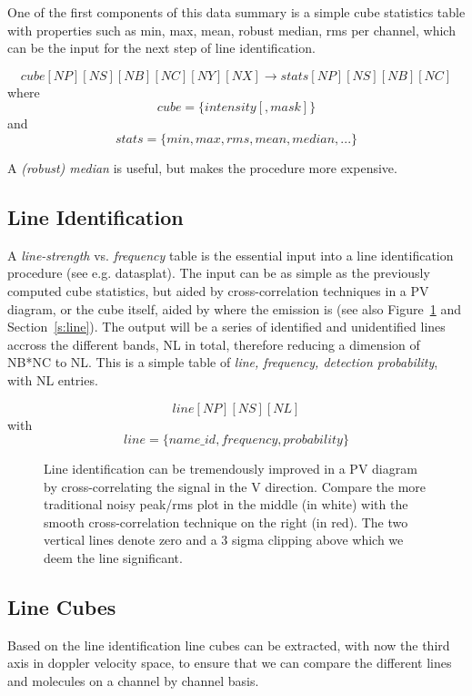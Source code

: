 \documentclass[preprint]{aastex} %
\begin{document}
One of the first components of this data summary is a simple cube
statistics table with properties such as min, max, mean, 
robust median, rms per channel,
which can be the input for the next step of line identification.

$$
cube[NP][NS][NB][NC][NY][NX] \rightarrow stats[NP][NS][NB][NC]
$$
where 
$$
     cube = \{ intensity [, mask] \}
$$
and
$$
stats = \{min,max,rms,mean,median,...\}
$$

A {\it (robust) median} is useful, but makes the procedure more expensive.


\subsection{Line Identification}

A {\it line-strength} vs. {\it frequency} table is the essential input
into a line identification procedure (see e.g. datasplat).
The input can be as simple as the previously computed cube statistics, 
but aided by cross-correlation techniques in a PV diagram, or the cube itself,
aided by where the emission is (see also Figure~\ref{fig:pvcorr4}
and Section~\ref{s:line}).
The output will be a series of identified and unidentified lines accross the different
bands, NL in total, therefore reducing a dimension of NB*NC to NL.
This is a simple table of 
{\it line, frequency, detection probability}, with NL entries.

$$
    line[NP][NS][NL]
$$
with
$$
    line = \{name\_id, frequency, probability\}
$$


\begin{figure}[ht]
\caption{Line identification can be tremendously improved in a PV diagram
by cross-correlating the signal in the V direction. Compare the more traditional
noisy peak/rms plot in the middle (in white) 
with the smooth cross-correlation technique on
the right (in red). The two vertical lines denote zero and a 3 sigma clipping 
above which we deem the line significant.}
\label{fig:pvcorr4}
\end{figure}


\subsection{Line Cubes}

Based on the line identification  line cubes can be extracted,
with now the third axis in doppler velocity space, to ensure
that we can compare the different lines and molecules on a channel
by channel basis.
\end{document}
